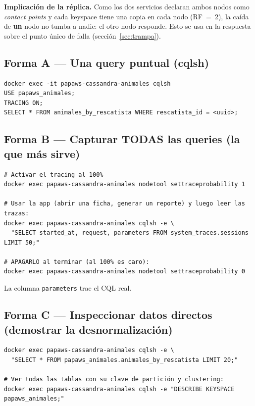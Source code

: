 \documentclass[11pt,a4paper]{article}
\begin{document}
\begin{nota}
\textbf{Implicación de la réplica.} Como los dos servicios declaran ambos nodos como
\emph{contact points} y cada keyspace tiene una copia en cada nodo (RF~=~2), la caída
de \textbf{un} nodo no tumba a nadie: el otro nodo responde. Esto se usa en la
respuesta sobre el punto único de falla (sección~\ref{sec:trampa}).
\end{nota}

\subsection{Forma A — Una query puntual (cqlsh)}
\begin{lstlisting}[style=shell]
docker exec -it papaws-cassandra-animales cqlsh
USE papaws_animales;
TRACING ON;
SELECT * FROM animales_by_rescatista WHERE rescatista_id = <uuid>;
\end{lstlisting}

\subsection{Forma B — Capturar TODAS las queries (la que más sirve)}
\begin{lstlisting}[style=shell]
# Activar el tracing al 100%
docker exec papaws-cassandra-animales nodetool settraceprobability 1

# Usar la app (abrir una ficha, generar un reporte) y luego leer las trazas:
docker exec papaws-cassandra-animales cqlsh -e \
  "SELECT started_at, request, parameters FROM system_traces.sessions LIMIT 50;"

# APAGARLO al terminar (al 100% es caro):
docker exec papaws-cassandra-animales nodetool settraceprobability 0
\end{lstlisting}
\noindent La columna \texttt{parameters} trae el CQL real.

\subsection{Forma C — Inspeccionar datos directos (demostrar la desnormalización)}
\begin{lstlisting}[style=shell]
docker exec papaws-cassandra-animales cqlsh -e \
  "SELECT * FROM papaws_animales.animales_by_rescatista LIMIT 20;"

# Ver todas las tablas con su clave de partición y clustering:
docker exec papaws-cassandra-animales cqlsh -e "DESCRIBE KEYSPACE papaws_animales;"
\end{lstlisting}
\end{document}

